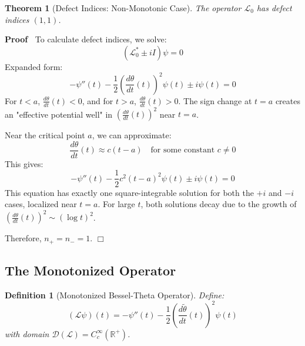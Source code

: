 \documentclass{article}
\newenvironment{proof}{\noindent\textbf{Proof\ }}{\hspace*{\fill}$\Box$\medskip}
\newtheorem{definition}{Definition}
\newtheorem{theorem}{Theorem}
\begin{document}
\begin{theorem}
  [Defect Indices: Non-Monotonic Case] The operator $\mathcal{L}_0$ has defect
  indices $(1, 1)$.
\end{theorem}

\begin{proof}
  To calculate defect indices, we solve:
  \begin{equation}
    (\mathcal{L}_0^{\ast} \pm iI) \psi = 0
  \end{equation}
  Expanded form:
  \begin{equation}
    - \psi'' (t) - \frac{1}{2} \left( \frac{d \theta}{dt} (t) \right)^2 \psi
    (t) \pm i \psi (t) = 0
  \end{equation}
  For $t < a$, $\frac{d \theta}{dt} (t) < 0$, and for $t > a$, $\frac{d
  \theta}{dt} (t) > 0$. The sign change at $t = a$ creates an "effective
  potential well" in $\left( \frac{d \theta}{dt} (t) \right)^2$ near $t = a$.
  
  Near the critical point $a$, we can approximate:
  \begin{equation}
    \frac{d \theta}{dt} (t) \approx c (t - a)  \quad \text{for some constant }
    c \neq 0
  \end{equation}
  This gives:
  \begin{equation}
    - \psi'' (t) - \frac{1}{2} c^2  (t - a)^2 \psi (t) \pm i \psi (t) = 0
  \end{equation}
  This equation has exactly one square-integrable solution for both the $+ i$
  and $- i$ cases, localized near $t = a$. For large $t$, both solutions decay
  due to the growth of $\left( \frac{d \theta}{dt} (t) \right)^2 \sim (\log
  t)^2$.
  
  Therefore, $n_+ = n_- = 1$.
\end{proof}

\subsection{The Monotonized Operator}

\begin{definition}
  [Monotonized Bessel-Theta Operator] Define:
  \begin{equation}
    (\mathcal{L} \psi) (t) = - \psi'' (t) - \frac{1}{2} \left( \frac{d
    \tilde{\theta}}{dt} (t) \right)^2 \psi (t)
  \end{equation}
  with domain $\mathcal{D} (\mathcal{L}) = C_c^{\infty} (\mathbb{R}^+)$.
\end{definition}
\end{document}
